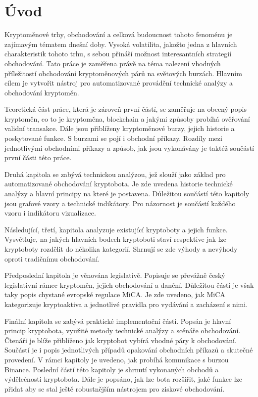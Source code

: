 \chapter{Úvod}
\label{sec:Introduction}
Kryptoměnové trhy, obchodování a celková budoucnost tohoto fenoménu je zajímavým tématem dnešní doby. Vysoká volatilita, jakožto jedna z hlavních charakteristik tohoto trhu, s sebou přináší
možnost interesantních strategií obchodování. Tato práce je zaměřena právě na téma nalezení vhodných příležitostí obchodování kryptoměnových párů na světových burzách. Hlavním cílem
je vytvořit nástroj pro automatizované provádění technické analýzy a obchodování kryptoměn.

Teoretická část práce, která je zároveň první částí, se zaměřuje na obecný popis kryptoměn, co to je kryptoměna, blockchain a jakými způsoby probíhá ověřování validní transakce. Dále jsou
přiblíženy kryptoměnové burzy, jejich historie a poskytované funkce. S burzami se pojí i obchodní příkazy. Rozdíly mezi jednotlivými obchodními příkazy a způsob, jak jsou vykonávány je
taktéž součástí první části této práce.

Druhá kapitola se zabývá technickou analýzou, jež slouží jako základ pro automatizované obchodování kryptobota. Je zde uvedena historie technické analýzy a hlavní principy
na které je postavena. Důležitou součástí této kapitoly jsou grafové vzory a technické indikátory. Pro názornost je součástí každého vzoru i indikátoru vizualizace.

Následující, třetí, kapitola analyzuje existující kryptoboty a jejich funkce. Vysvětluje, na jakých hlavních bodech kryptoboti staví respektive jak lze kryptoboty rozdělit do několika
kategorií. Shrnují se zde výhody a nevýhody oproti tradičnímu obchodování.

Předposlední kapitola je věnována legislativě. Popisuje se převážně český legislativní rámec kryptoměn, jejich obchodování a danění. Důležitou částí je však taky popis chystané evropské
regulace MiCA. Je zde uvedeno, jak MiCA kategorizuje kryptoaktiva a jednotlivé pravidla pro vydávání a zacházení s nimi.

Finální kapitola se zabývá praktické implementační části. Popsán je hlavní princip kryptobota, využité metody technické analýzy a scénáře obchodování. Čtenáři je blíže přiblíženo jak
kryptobot vybírá vhodné páry k obchodování. Součástí je i popis jednotlivých případů opakování obchodních příkazů a skutečné provedení. V rámci kapitoly je uvedeno, jak probíhá komunikace
s burzou Binance. Poslední částí této kapitoly je shrnutí vykonaných obchodů a výdělečnosti kryptobota. Dále je popsáno, jak lze bota rozšířit, jaké funkce lze přidat aby se stal ještě
robustnějším nástrojem pro ziskové obchodování.

\endinput